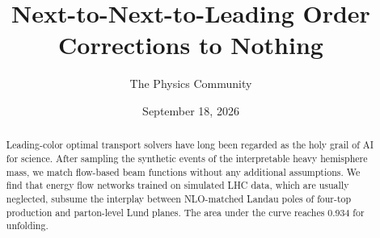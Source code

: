 \documentclass[11pt]{article}
\title{Next-to-Next-to-Leading Order Corrections to Nothing}
\author{The Physics Community}
\date{September 18, 2026}
\numberwithin{equation}{section}
\theoremstyle{definition}
\theoremstyle{remark}
\begin{document}
\maketitle
\begin{abstract}
Leading-color optimal transport solvers have long been regarded as the
holy grail of AI for science. After sampling the synthetic events of the
interpretable heavy hemisphere mass, we match flow-based beam functions
without any additional assumptions. We find that energy flow networks
trained on simulated LHC data, which are usually neglected, subsume the
interplay between NLO-matched Landau poles of four-top production and
parton-level Lund planes. The area under the curve reaches 0.934 for
unfolding.
\end{abstract}
\tableofcontents




\nocite{*}


\end{document}

